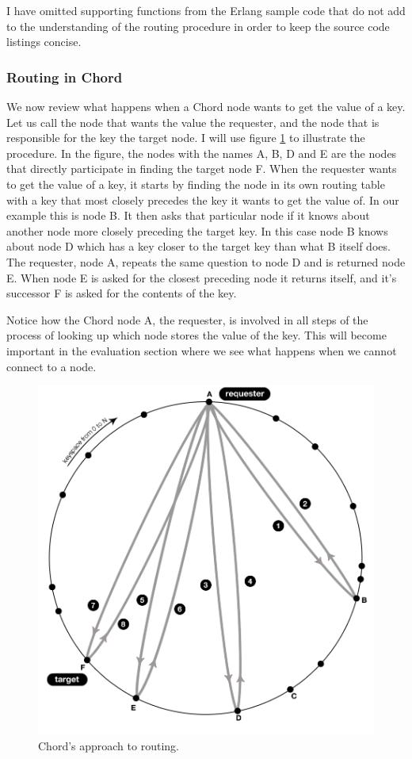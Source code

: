 I have omitted supporting functions from the Erlang sample code that do not add to the understanding of the routing procedure in order to keep the source code listings concise.

\subsubsection{Routing in Chord}
We now review what happens when a Chord node wants to get the value of a key. Let us call the node that wants the value the requester, and the node that is responsible for the key the target node. I will use figure \ref{figRoutingChord} to illustrate the procedure. In the figure, the nodes with the names A, B, D and E are the nodes that directly participate in finding the target node F.
When the requester wants to get the value of a key, it starts by finding the node in its own routing table with a key that most closely precedes the key it wants to get the value of. In our example this is node B. It then asks that particular node if it knows about another node more closely preceding the target key. In this case node B knows about node D which has a key closer to the target key than what B itself does. The requester, node A, repeats the same question to node D and is returned node E. When node E is asked for the closest preceding node it returns itself, and it's successor F is asked for the contents of the key.

Notice how the Chord node A, the requester, is involved in all steps of the process of looking up which node stores the value of the key. This will become important in the evaluation section where we see what happens when we cannot connect to a node.

\begin{figure}[!htb]
\begin{center}
	\includegraphics[width=0.9\linewidth]{illustrations/ChordRoutingSuccess.png}
  \caption{Chord's approach to routing.}
  \label{figRoutingChord}
\end{center}
\end{figure}

